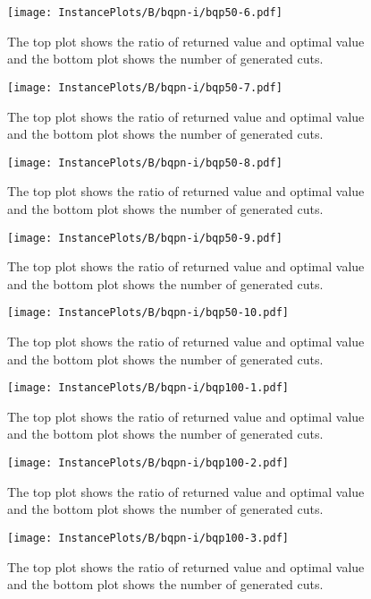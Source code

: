 \documentclass[10pt,a4paper]{article}
\begin{document}
\begin{figure}[H]
\texttt{[image: InstancePlots/B/bqpn-i/bqp50-6.pdf]}
\caption{The top plot shows the ratio of returned value and optimal value     and the bottom plot shows the number of generated cuts.}
\end{figure}

\begin{figure}[H]
\texttt{[image: InstancePlots/B/bqpn-i/bqp50-7.pdf]}
\caption{The top plot shows the ratio of returned value and optimal value     and the bottom plot shows the number of generated cuts.}
\end{figure}

\begin{figure}[H]
\texttt{[image: InstancePlots/B/bqpn-i/bqp50-8.pdf]}
\caption{The top plot shows the ratio of returned value and optimal value     and the bottom plot shows the number of generated cuts.}
\end{figure}

\begin{figure}[H]
\texttt{[image: InstancePlots/B/bqpn-i/bqp50-9.pdf]}
\caption{The top plot shows the ratio of returned value and optimal value     and the bottom plot shows the number of generated cuts.}
\end{figure}

\begin{figure}[H]
\texttt{[image: InstancePlots/B/bqpn-i/bqp50-10.pdf]}
\caption{The top plot shows the ratio of returned value and optimal value     and the bottom plot shows the number of generated cuts.}
\end{figure}

\begin{figure}[H]
\texttt{[image: InstancePlots/B/bqpn-i/bqp100-1.pdf]}
\caption{The top plot shows the ratio of returned value and optimal value     and the bottom plot shows the number of generated cuts.}
\end{figure}

\begin{figure}[H]
\texttt{[image: InstancePlots/B/bqpn-i/bqp100-2.pdf]}
\caption{The top plot shows the ratio of returned value and optimal value     and the bottom plot shows the number of generated cuts.}
\end{figure}

\begin{figure}[H]
\texttt{[image: InstancePlots/B/bqpn-i/bqp100-3.pdf]}
\caption{The top plot shows the ratio of returned value and optimal value     and the bottom plot shows the number of generated cuts.}
\end{figure}
\end{document}
